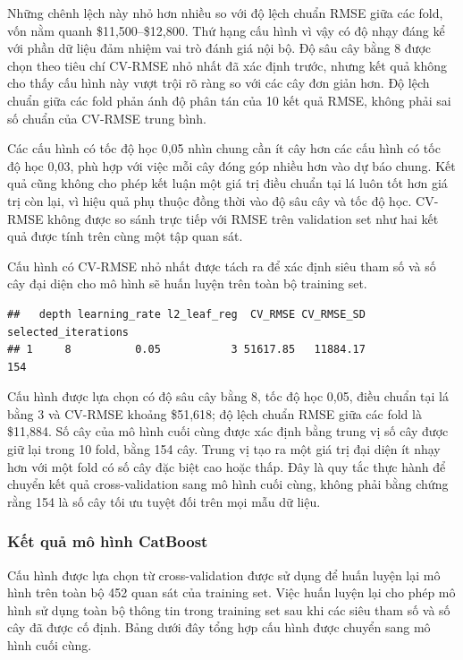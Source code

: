 Những chênh lệch này nhỏ hơn nhiều so với độ lệch chuẩn RMSE giữa các
fold, vốn nằm quanh \$11,500--\$12,800. Thứ hạng cấu hình vì vậy có độ
nhạy đáng kể với phần dữ liệu đảm nhiệm vai trò đánh giá nội bộ. Độ sâu
cây bằng 8 được chọn theo tiêu chí CV-RMSE nhỏ nhất đã xác định trước,
nhưng kết quả không cho thấy cấu hình này vượt trội rõ ràng so với các
cây đơn giản hơn. Độ lệch chuẩn giữa các fold phản ánh độ phân tán của
10 kết quả RMSE, không phải sai số chuẩn của CV-RMSE trung bình.

Các cấu hình có tốc độ học 0,05 nhìn chung cần ít cây hơn các cấu hình
có tốc độ học 0,03, phù hợp với việc mỗi cây đóng góp nhiều hơn vào dự
báo chung. Kết quả cũng không cho phép kết luận một giá trị điều chuẩn
tại lá luôn tốt hơn giá trị còn lại, vì hiệu quả phụ thuộc đồng thời vào
độ sâu cây và tốc độ học. CV-RMSE không được so sánh trực tiếp với RMSE
trên validation set như hai kết quả được tính trên cùng một tập quan
sát.

Cấu hình có CV-RMSE nhỏ nhất được tách ra để xác định siêu tham số và số
cây đại diện cho mô hình sẽ huấn luyện trên toàn bộ training set.

\begin{verbatim}
##   depth learning_rate l2_leaf_reg  CV_RMSE CV_RMSE_SD selected_iterations
## 1     8          0.05           3 51617.85   11884.17                 154
\end{verbatim}

Cấu hình được lựa chọn có độ sâu cây bằng 8, tốc độ học 0,05, điều chuẩn
tại lá bằng 3 và CV-RMSE khoảng \$51,618; độ lệch chuẩn RMSE giữa các
fold là \$11,884. Số cây của mô hình cuối cùng được xác định bằng trung
vị số cây được giữ lại trong 10 fold, bằng 154 cây. Trung vị tạo ra một
giá trị đại diện ít nhạy hơn với một fold có số cây đặc biệt cao hoặc
thấp. Đây là quy tắc thực hành để chuyển kết quả cross-validation sang
mô hình cuối cùng, không phải bằng chứng rằng 154 là số cây tối ưu tuyệt
đối trên mọi mẫu dữ liệu.

\subsubsection{Kết quả mô hình
CatBoost}\label{nghi:kux1ebft-quux1ea3-muxf4-huxecnh-catboost}

Cấu hình được lựa chọn từ cross-validation được sử dụng để huấn luyện
lại mô hình trên toàn bộ 452 quan sát của training set. Việc huấn luyện
lại cho phép mô hình sử dụng toàn bộ thông tin trong training set sau
khi các siêu tham số và số cây đã được cố định. Bảng dưới đây tổng hợp
cấu hình được chuyển sang mô hình cuối cùng.

